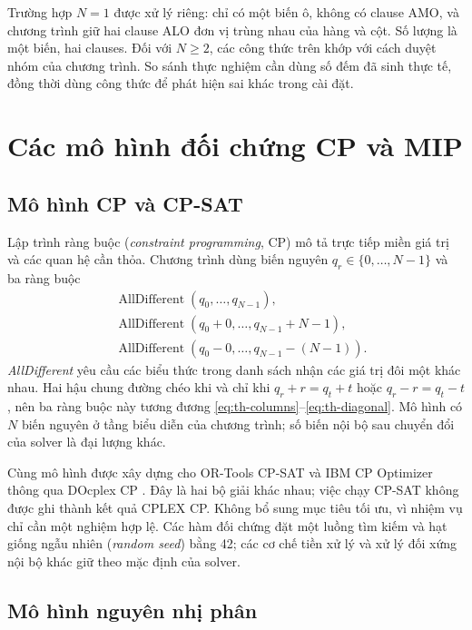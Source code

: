 Trường hợp $N=1$ được xử lý riêng: chỉ có một biến ô, không có
clause AMO, và chương trình giữ hai clause ALO đơn vị trùng nhau của
hàng và cột. Số lượng là một biến, hai clauses. Đối với $N\geq2$,
các công thức trên khớp với cách duyệt nhóm của chương trình. So sánh
thực nghiệm cần dùng số đếm đã sinh thực tế, đồng thời dùng công thức
để phát hiện sai khác trong cài đặt.

\section{Các mô hình đối chứng CP và MIP}
\label{sec:theory-baselines}

\subsection{Mô hình CP và CP-SAT}

Lập trình ràng buộc (\emph{constraint programming}, CP) mô tả trực tiếp
miền giá trị và các quan hệ cần thỏa. Chương trình dùng biến nguyên
$q_r\in\{0,\ldots,N-1\}$ và ba ràng buộc
\begin{align}
 &\operatorname{AllDifferent}(q_0,\ldots,q_{N-1}),\label{eq:th-cp-column}\\
 &\operatorname{AllDifferent}(q_0+0,\ldots,q_{N-1}+N-1),\\
 &\operatorname{AllDifferent}(q_0-0,\ldots,q_{N-1}-(N-1)).
 \label{eq:th-cp-diagonal}
\end{align}
\emph{AllDifferent} yêu cầu các biểu thức trong danh sách nhận các
giá trị đôi một khác nhau. Hai hậu chung đường chéo khi và chỉ khi
$q_r+r=q_t+t$ hoặc $q_r-r=q_t-t$, nên ba ràng buộc này tương đương
\eqref{eq:th-columns}--\eqref{eq:th-diagonal}. Mô hình có $N$ biến
nguyên ở tầng biểu diễn của chương trình; số biến nội bộ sau chuyển
đổi của solver là đại lượng khác.

Cùng mô hình được xây dựng cho OR-Tools CP-SAT \cite{ortools} và
IBM CP Optimizer thông qua DOcplex CP \cite{ibm}. Đây là hai bộ giải
khác nhau; việc chạy CP-SAT không được ghi thành kết quả CPLEX CP.
Không bổ sung mục tiêu tối ưu, vì nhiệm vụ chỉ cần một nghiệm hợp lệ.
Các hàm đối chứng đặt một luồng tìm kiếm và hạt giống ngẫu nhiên
(\emph{random seed}) bằng 42; các cơ chế tiền xử lý và xử lý đối xứng
nội bộ khác giữ theo mặc định của solver.

\subsection{Mô hình nguyên nhị phân}

